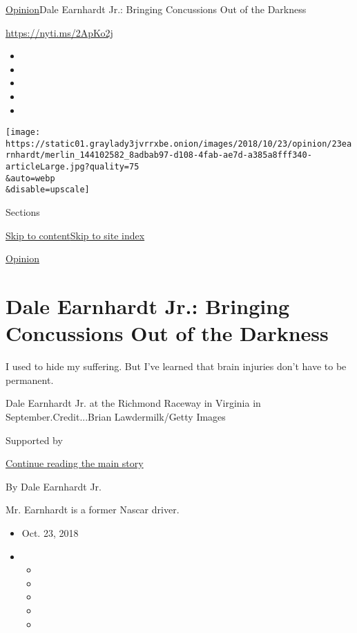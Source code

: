 \href{/section/opinion}{Opinion}\textbar{}Dale Earnhardt Jr.: Bringing
Concussions Out of the Darkness

\url{https://nyti.ms/2ApKo2j}

\begin{itemize}
\item
\item
\item
\item
\item
\end{itemize}

\texttt{[image: https://static01.graylady3jvrrxbe.onion/images/2018/10/23/opinion/23earnhardt/merlin\_144102582\_8adbab97-d108-4fab-ae7d-a385a8fff340-articleLarge.jpg?quality=75\\\&auto=webp\\\&disable=upscale]}

Sections

\protect\hyperlink{site-content}{Skip to
content}\protect\hyperlink{site-index}{Skip to site index}

\href{/section/opinion}{Opinion}

\hypertarget{dale-earnhardt-jr-bringing-concussions-out-of-the-darkness}{%
\section{Dale Earnhardt Jr.: Bringing Concussions Out of the
Darkness}\label{dale-earnhardt-jr-bringing-concussions-out-of-the-darkness}}

I used to hide my suffering. But I've learned that brain injuries don't
have to be permanent.

Dale Earnhardt Jr. at the Richmond Raceway in Virginia in
September.Credit...Brian Lawdermilk/Getty Images

Supported by

\protect\hyperlink{after-sponsor}{Continue reading the main story}

By Dale Earnhardt Jr.

Mr. Earnhardt is a former Nascar driver.

\begin{itemize}
\item
  Oct. 23, 2018
\item
  \begin{itemize}
  \item
  \item
  \item
  \item
  \item
  \end{itemize}
\end{itemize}

